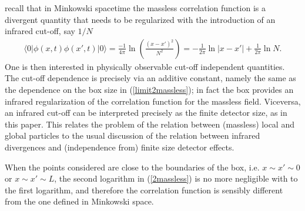 \documentclass[11pt, nofootinbib]{revtex4-2}
\newcommand{\bea}{\begin{eqnarray}}
\newcommand{\eea}{\end{eqnarray}}
\begin{document}
recall that in Minkowski spacetime the massless correlation function
is a divergent quantity that needs to be regularized with the
introduction of an infrared cut-off, say $1/N$
%
\bea \langle 0 | \phi(x,t) \phi(x',t) | 0 \rangle = \frac{-1}{4 \pi}
\ln \left( \frac{(x-x')^2}{N^2} \right) 
=
-\frac{1}{2\pi} \ln|x-x'| + \frac{1}{2\pi} \ln N .
 \eea
%
One is then interested in physically observable cut-off independent
quantities.  The cut-off dependence is precisely via an additive
constant, namely the same as the dependence on the box size in
(\ref{limit2massless}); in fact the box provides an infrared
regularization of the correlation function for the massless field. 
Viceversa, an infrared cut-off can be interpreted precisely as the
finite detector size, as in this paper.  This relates the problem of
the relation between (massless) local and global particles to the
usual discussion of the relation between infrared divergences and
(independence from) finite size detector effects.

When the points considered are close to the boundaries of the box,
i.e. $x \sim x' \sim 0$ or $x \sim x' \sim L$, the second logarithm in
(\ref{2massless}) is no more negligible with to the first logarithm,
and therefore the correlation function is sensibly different from the
one defined in Minkowski space.
\end{document}

